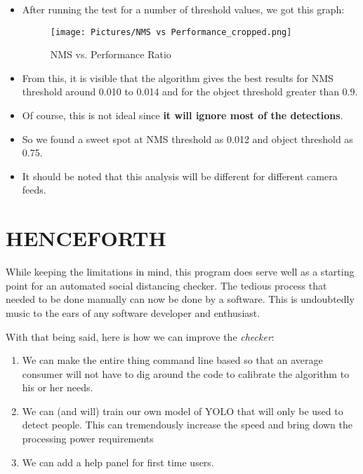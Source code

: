 \documentclass[a4paper]{article}
\begin{document}
\begin{enumerate}
\begin{itemize}
        \pagebreak
        \item After running the test for a number of threshold values, we got this graph:
        \begin{figure}[h]
            \centering
            \texttt{[image: Pictures/NMS vs Performance\_cropped.png]} 
            \caption{NMS vs. Performance Ratio}
            \label{fig:NMSvsPerf}
        \end{figure}
        \item From this, it is visible that the algorithm gives the best results for NMS threshold around 0.010 to 0.014 and for the object threshold greater than 0.9.
        \item Of course, this is not ideal since \textbf{it will ignore most of the detections}.
        \item So we found a sweet spot at NMS threshold as 0.012 and object threshold as 0.75.
        \item It should be noted that this analysis will be different for different camera feeds.
    \end{itemize}
\end{enumerate}

\pagebreak

\section{HENCEFORTH}

While keeping the limitations in mind, this program does serve well as a starting point for an automated social distancing checker. The tedious process that needed to be done manually can now be done by a software. This is undoubtedly music to the ears of any software developer and enthusiast.

With that being said, here is how we can improve the \textit{checker}:

\begin{enumerate}
    \item We can make the entire thing command line based so that an average consumer will not have to dig around the code to calibrate the algorithm to his or her needs.
    \item We can (and will) train our own model of YOLO that will only be used to detect people. This can tremendously increase the speed and bring down the processing power requirements
    \item We can add a help panel for first time users.
\end{enumerate}

\renewcommand{\refname}{REFERENCES}


\end{document}
